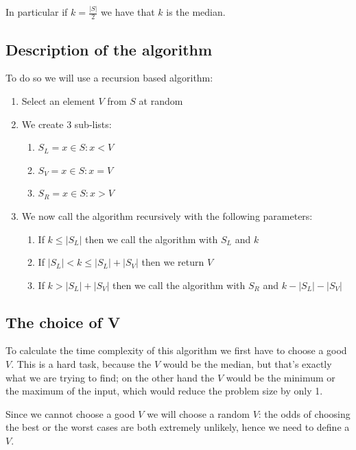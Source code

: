 \documentclass[12pt]{extarticle}
\begin{document}
In particular if $k = \frac{|S|}{2}$ we have that $k$ is the median.

\subsection{Description of the algorithm}

To do so we will use a recursion based algorithm:

\begin{enumerate}
    \item Select an element $V$ from $S$ at random
    \item We create 3 sub-lists:
          \begin{enumerate}
              \item $S_L = {x \in S : x < V}$
              \item $S_V = {x \in S : x = V}$
              \item $S_R = {x \in S : x > V}$
          \end{enumerate}
    \item We now call the algorithm recursively with the following parameters:
          \begin{enumerate}
              \item If $k \le |S_L|$ then we call the algorithm with $S_L$ and $k$
              \item If $|S_L| < k \leq |S_L| + |S_V|$ then we return $V$
              \item If $k > |S_L| + |S_V|$ then we call the algorithm with $S_R$ and $k - |S_L| - |S_V|$
          \end{enumerate}
\end{enumerate}

\subsection{The choice of V}

To calculate the time complexity of this algorithm we first have to choose a good $V$.
This is a hard task, because the  $V$ would be the median, but that's exactly what we are trying to find;
on the other hand the  $V$ would be the minimum or the maximum of the input, which would reduce the problem size by only 1.

Since we cannot choose a good $V$ we will choose a random $V$:
the odds of choosing the best or the worst cases are both extremely unlikely,
hence we need to define a  $V$.
\end{document}
